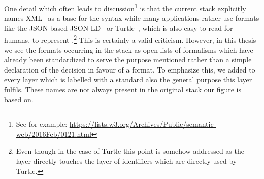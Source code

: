 % 
% 
% 
% 
% 
% 
%
%
One detail which often leads to discussion\footnote{See for example: \url{https://lists.w3.org/Archives/Public/semantic-web/2016Feb/0121.html}} 
is that the current stack explicitly names XML~\cite{XML} as a base for the syntax while many applications rather use formats like 
the JSON-based JSON-LD~\cite{jsonld} or Turtle~\cite{turtle}, 
which is also easy to read for humans, to represent \rdf.\footnote{Even though in the case of Turtle this point 
is somehow addressed as the \rdf layer directly 
touches the layer of identifiers which are directly used by Turtle.} This is certainly a valid criticism. 
However, in this thesis we see the formats occurring in the stack as open lists of formalisms which have already been standardized to serve the purpose mentioned 
rather than a simple declaration of the decision in favour of a format. To emphasize this, we added to every layer which is labelled with a standard also the general purpose this layer 
fulfils. These names are not always present in the original stack our figure is based on.





